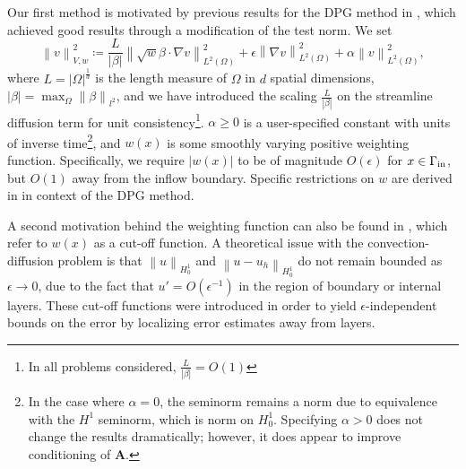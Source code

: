 \documentclass[final,leqno]{siamltex}
\newcommand{\bs}[1]{\boldsymbol{#1}}
\newcommand{\nor}[1]{\left\| #1 \right\|}
\newcommand{\LRp}[1]{\left( #1 \right)}
\newcommand{\LRb}[1]{\left| #1 \right|}
\newcommand{\Grad} {\ensuremath{\nabla}}
\renewcommand{\L}{L^2\LRp{\Omega}}
\begin{document}
Our first method is motivated by previous results for the DPG method in \cite{DPGrobustness}, which achieved good results through a modification of the test norm.  We set
\[
\nor{v}_{V,w}^2 \coloneqq \frac{L}{\LRb{\beta}}\nor{\sqrt{w}\beta\cdot \Grad v}_{\L}^2 + \epsilon\nor{\Grad v}_{\L}^2 + \alpha\nor{v}_{\L}^2,
\]
where $L = \LRb{\Omega}^{\frac{1}{d}}$ is the length measure of $\Omega$ in $d$ spatial dimensions, $\LRb{\beta} = \max_\Omega \nor{\beta}_{l^2}$, and we have introduced the scaling $\frac{L}{\LRb{\beta}}$ on the streamline diffusion term for unit consistency\footnote{In all problems considered, $\frac{L}{\LRb{\beta}} = O(1)$}. $\alpha \geq 0$ is a user-specified constant with units of inverse time\footnote{In the case where $\alpha = 0$, the seminorm remains a norm due to equivalence with the $H^1$ seminorm, which is norm on $H^1_0$.  Specifying $\alpha > 0$ does not change the results dramatically; however, it does appear to improve conditioning of $\bs{A}$.}, and $w(x)$ is some smoothly varying positive weighting function.  Specifically, we require $\LRb{w(x)}$ to be of magnitude $O(\epsilon)$ for $x\in \Gamma_{\rm in}$, but $O(1)$ away from the inflow boundary.  Specific restrictions on $w$ are derived in \cite{DPGrobustness} in context of the DPG method.  

A second motivation behind the weighting function can also be found in \cite{stynesSUPG, roos2008robust, johnsonCrosswind}, which refer to $w(x)$ as a cut-off function.  A theoretical issue with the convection-diffusion problem is that $\nor{u}_{H^1_0}$ and $\nor{u-u_h}_{H^1_0}$ do not remain bounded as $\epsilon\rightarrow 0$, due to the fact that $u' = O(\epsilon^{-1})$ in the region of boundary or internal layers.  These cut-off functions were introduced in order to yield $\epsilon$-independent bounds on the error by localizing error estimates away from layers.
\end{document}
